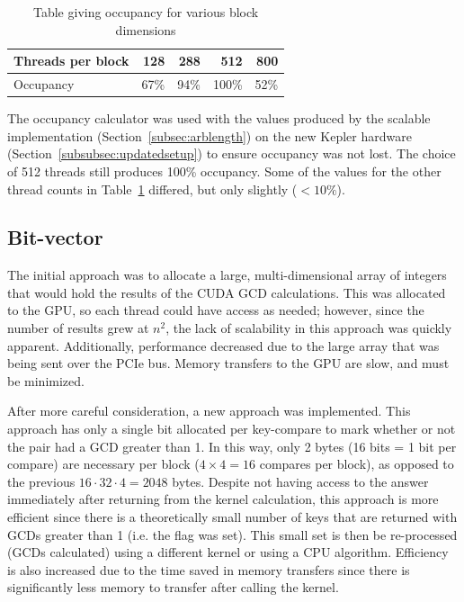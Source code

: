\documentclass[smallextended]{svjour3}       %
\begin{document}
\begin{table}
   \centering
   \begin{tabular}{l|rrrr}
      Threads per block & 128 & 288 & 512 & 800\\
      \hline
              Occupancy & 67\% & 94\% & 100\% & 52\%\\
   \end{tabular}
   \caption{Table giving occupancy for various block dimensions}
   \label{tab:occupancy}
\end{table}

The occupancy calculator was used with the values produced by the scalable
implementation (Section~\ref{subsec:arblength}) on the new Kepler hardware
(Section~\ref{subsubsec:updatedsetup}) to ensure occupancy was not lost. The
choice of 512 threads still produces 100\% occupancy. Some of the values
for the other thread counts in Table~\ref{tab:occupancy} differed, but only
slightly ($< 10\%$).

\subsection{Bit-vector}
\label{subsec:bitvector}
The initial approach was to allocate a large, multi-dimensional array of 
integers that would hold the results of the CUDA GCD calculations. This was 
allocated to the GPU, so each thread could have access as needed; however, 
since the number of results grew at $n^2$, the lack of scalability in this 
approach was quickly apparent. Additionally, performance decreased due to the 
large array that was being sent over the PCIe bus. Memory transfers to 
the GPU are slow, and must be minimized.

After more careful consideration, a new approach was implemented. This approach
has only a single bit allocated per key-compare to mark whether or not the pair 
had a GCD greater than 1. In this way, only 2 bytes (16 bits = 1 bit per 
compare) are necessary per block ($4\times4 = 16$ compares per block), as 
opposed to the previous $16 \cdot 32 \cdot 4 = 2048$ bytes. Despite not having
access to the answer immediately after returning from the kernel calculation,
this approach is more efficient since there is a theoretically small number of
keys that are returned with GCDs greater than 1 (i.e. the flag was set). This
small set is then be re-processed (GCDs calculated) using a different kernel or
using a CPU algorithm. Efficiency is also increased due to the time saved in
memory transfers since there is significantly less memory to transfer after
calling the kernel.
\end{document}
